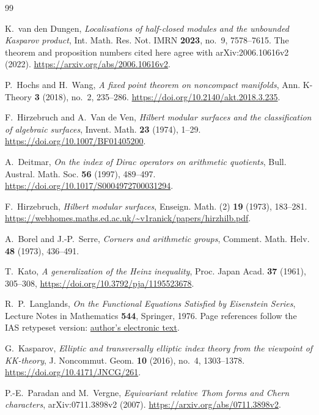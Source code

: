 \documentclass[11pt]{article}
\theoremstyle{definition}
\theoremstyle{plain}
\numberwithin{equation}{section}
\begin{document}
\clearpage
\begin{thebibliography}{99}
\small
\setlength{\itemsep}{2pt}
\setlength{\parsep}{0pt}

K.~van den Dungen,
\emph{Localisations of half-closed modules and the unbounded
Kasparov product},
Int. Math. Res. Not. IMRN \textbf{2023}, no.~9, 7578--7615.
The theorem and proposition numbers cited here agree with
arXiv:2006.10616v2 (2022).
\url{https://arxiv.org/abs/2006.10616v2}.

P.~Hochs and H.~Wang,
\emph{A fixed point theorem on noncompact manifolds},
Ann. K-Theory \textbf{3} (2018), no.~2, 235--286.
\url{https://doi.org/10.2140/akt.2018.3.235}.

F.~Hirzebruch and A.~Van de Ven,
\emph{Hilbert modular surfaces and the classification of algebraic surfaces},
Invent. Math. \textbf{23} (1974), 1--29.
\url{https://doi.org/10.1007/BF01405200}.

A.~Deitmar,
\emph{On the index of Dirac operators on arithmetic quotients},
Bull. Austral. Math. Soc. \textbf{56} (1997), 489--497.
\url{https://doi.org/10.1017/S0004972700031294}.

F.~Hirzebruch,
\emph{Hilbert modular surfaces},
Enseign. Math. (2) \textbf{19} (1973), 183--281.
\url{https://webhomes.maths.ed.ac.uk/~v1ranick/papers/hirzhilb.pdf}.

A.~Borel and J.-P.~Serre, \emph{Corners and arithmetic groups},
Comment. Math. Helv. \textbf{48} (1973), 436--491.

T.~Kato, \emph{A generalization of the Heinz inequality},
Proc. Japan Acad. \textbf{37} (1961), 305--308,
\url{https://doi.org/10.3792/pja/1195523678}.

 R.~P.~Langlands, \emph{On the Functional Equations Satisfied by
Eisenstein Series}, Lecture Notes in Mathematics \textbf{544}, Springer, 1976.  Page
references follow the IAS retypeset version:
\href{https://publications.ias.edu/sites/default/files/functional-equations-eisenstein_rpl_8.pdf}{author's
electronic text}.

G.~Kasparov,
\emph{Elliptic and transversally elliptic index theory
from the viewpoint of KK-theory},
J. Noncommut. Geom. \textbf{10} (2016), no.~4, 1303--1378.
\url{https://doi.org/10.4171/JNCG/261}.

P.-E.~Paradan and M.~Vergne,
\emph{Equivariant relative Thom forms and Chern characters},
arXiv:0711.3898v2 (2007).
\url{https://arxiv.org/abs/0711.3898v2}.


\end{thebibliography}
\end{document}
